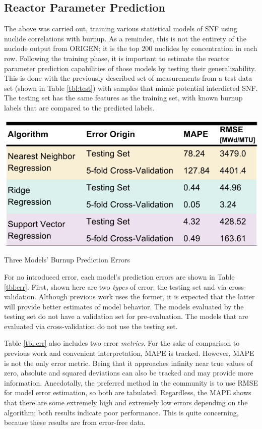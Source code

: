 \subsection{Reactor Parameter Prediction}
\label{sec:rxtrparam}

The above was carried out, training various statistical models of \gls{SNF}
using nuclide correlations with burnup. As a reminder, this is not the entirety
of the nuclode output from \gls{ORIGEN}; it is the top 200 nuclides by
concentration in each row. Following the training phase, it is important to
estimate the reactor parameter prediction capabilities of those models by
testing their generalizability.  This is done with the previously described set
of measurements from a test data set (shown in Table \ref{tbl:test}) with
samples that mimic potential interdicted \gls{SNF}. The testing set has the
same features as the training set, with known burnup labels that are compared
to the predicted labels. 

\begin{table}[!htb]
  \centering
  \includegraphics[width=0.8\linewidth]{./chapters/demo_method/results1.png}
  \caption{Three Models' Burnup Prediction Errors}
  \label{tbl:err}
\end{table}

For no introduced error, each model's prediction errors are shown in Table
\ref{tbl:err}.  First, shown here are two \textit{types} of error: the testing
set and via cross-validation.  Although previous work uses the former, it is
expected that the latter will provide better estimates of model behavior.  The
models evaluated by the testing set do not have a validation set for
pre-evaluation.  The models that are evaluated via cross-validation do not use
the testing set. 

Table \ref{tbl:err} also includes two error \textit{metrics}.  For the sake of
comparison to previous work and convenient interpretation, \gls{MAPE} is
tracked. However, \gls{MAPE} is not the only error metric. Being that it
approaches infinity near true values of zero, absolute and squared deviations
can also be tracked and may provide more information.  Anecdotally, the
preferred method in the community is to use \gls{RMSE} for model error
estimation, so both are tabulated.  Regardless, the \gls{MAPE} shows that there
are some extremely high and extremely low errors depending on the algorithm;
both results indicate poor performance.  This is quite concerning, because
these results are from error-free data.

